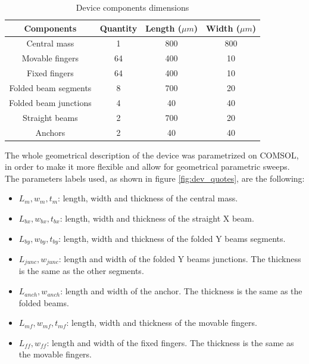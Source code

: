 \documentclass[lettersize,journal]{IEEEtran}
\begin{document}
        \begin{table}[h!]
            \renewcommand{\arraystretch}{1.5}
            \centering
            \caption{Device components dimensions}
            \label{tab:size}
            \begin{tabular}{|c|c|c|c|}
                \hline
                \textbf{Components}   & \textbf{Quantity} & \textbf{Length (\(\mu m\))} & \textbf{Width (\(\mu m\))} \\ \hline
                Central mass          & 1                 & 800                  & 800                 \\ \hline
                Movable fingers       & 64                & 400                  & 10                  \\ \hline
                Fixed fingers         & 64                & 400                  & 10                  \\ \hline
                Folded beam segments  & 8                 & 700                  & 20                  \\ \hline
                Folded beam junctions & 4                 & 40                   & 40                  \\ \hline
                Straight beams        & 2                 & 700                  & 20                  \\ \hline
                Anchors               & 2                 & 40                   & 40                  \\ \hline
            \end{tabular}
        \end{table}
        
        The whole geometrical description of the device was parametrized on COMSOL, in order to make it more flexible and allow for geometrical parametric sweeps. The parameters labels used, as shown in figure \ref{fig:dev_quotes}, are the following:
        
        \begin{itemize}
            \item \(L_m, w_m, t_m\): length, width and thickness of the central mass.
            \item \(L_{bx}, w_{bx}, t_{bx}\): length, width and thickness of the straight X beam.
            \item \(L_{by}, w_{by}, t_{by}\): length, width and thickness of the folded Y beams segments.
            \item \(L_{junc}, w_{junc}\): length and width of the folded Y beams junctions. The thickness is the same as the other segments.
            \item \(L_{anch}, w_{anch}\): length and width of the anchor. The thickness is the same as the folded beams.
            \item \(L_{mf}, w_{mf}, t_{mf}\): length, width and thickness of the movable fingers.
            \item \(L_{ff}, w_{ff}\): length and width of the fixed fingers. The thickness is the same as the movable fingers.
        \end{itemize}
        
\end{document}
